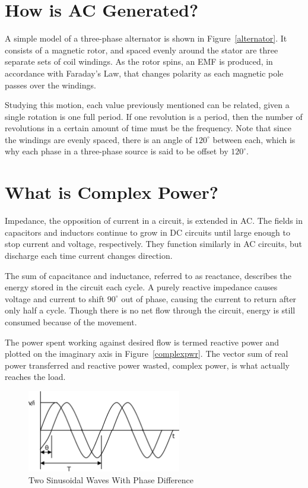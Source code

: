 \documentclass[12pt]{article}
\begin{document}
\section*{How is \ac{AC} Generated?}

A simple model of a three-phase alternator is shown in Figure~\ref{alternator}.
It consists of a magnetic rotor, and spaced evenly around the stator are three
separate sets of coil windings.  As the rotor spins, an \ac{EMF} is produced,
in accordance with Faraday's Law, that changes polarity as each magnetic pole
passes over the windings.

Studying this motion, each value previously mentioned can be related, given a
single rotation is one full period.  If one revolution is a period, then the
number of revolutions in a certain amount of time must be the frequency.  Note
that since the windings are evenly spaced, there is an angle of $120^\circ$
between each, which is why each phase in a three-phase source is said to be
offset by $120^\circ$.

\section*{What is Complex Power?}

Impedance, the opposition of current in a circuit, is extended in \ac{AC}.  The
fields in capacitors and inductors continue to grow in \ac{DC} circuits until
large enough to stop current and voltage, respectively.  They function
similarly in \ac{AC} circuits, but discharge each time current changes
direction.

The sum of capacitance and inductance, referred to as reactance, describes the
energy stored in the circuit each cycle.  A purely reactive impedance causes
voltage and current to shift $90^\circ$ out of phase, causing the current to
return after only half a cycle.  Though there is no net flow through the
circuit, energy is still consumed because of the movement.

The power spent working against desired flow is termed reactive power and
plotted on the imaginary axis in Figure~\ref{complexpwr}.  The vector sum of
real power transferred and reactive power wasted, complex power, is what
actually reaches the load.

\begin{figure}[p]
	\centering
	\includegraphics[width=0.6\textwidth]{img/acwave}
	\caption{Two Sinusoidal Waves With Phase Difference}
	\label{acwave}
\end{figure}
\end{document}
